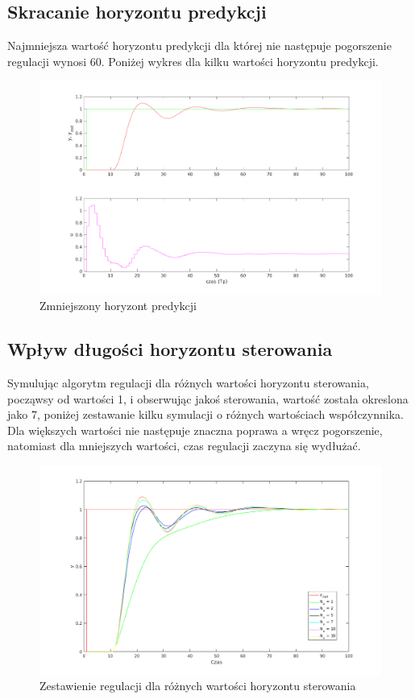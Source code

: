 \documentclass[a4paper, 11pt]{article}
\begin{document}
\subsection{Skracanie horyzontu predykcji}
Najmniejsza wartość horyzontu predykcji dla której nie następuje pogorszenie regulacji wynosi 60. Poniżej wykres dla kilku wartości horyzontu predykcji. 
\begin{figure}[H]
\centering
\includegraphics[scale=0.60]{horyzont_predykcji_skracanie.png}
\caption{Zmniejszony horyzont predykcji}
\label{}
\end{figure}

\subsection{Wpływ długości horyzontu sterowania}
Symulując algorytm regulacji dla różnych wartości horyzontu sterowania, począwsy od wartości 1, i obserwując jakoś sterowania, wartość została okreslona jako 7, poniżej zestawanie kilku symulacji o różnych wartościach współczynnika. Dla większych wartości nie następuje znaczna poprawa a wręcz pogorszenie, natomiast dla mniejszych wartości, czas regulacji zaczyna się wydłużać. 
\begin{figure}[H]
\centering
\includegraphics[scale=0.60]{horyzont_sterowania.png}
\caption{Zestawienie regulacji dla różnych wartości horyzontu sterowania}
\label{}
\end{figure}
\end{document}
